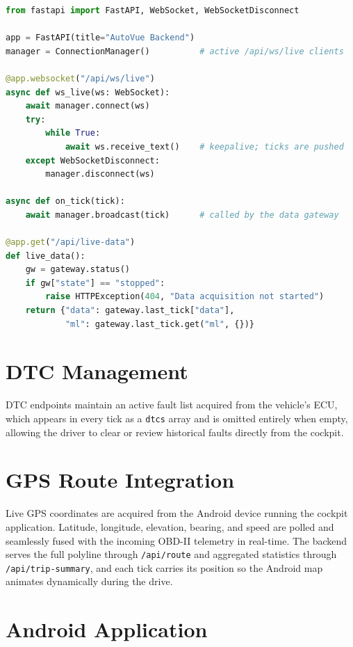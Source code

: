 \documentclass[10pt,a4paper]{report}
\begin{document}
\begin{lstlisting}[language=Python, caption={WebSocket Broadcast Layer}, label={lst:ws}]
from fastapi import FastAPI, WebSocket, WebSocketDisconnect

app = FastAPI(title="AutoVue Backend")
manager = ConnectionManager()          # active /api/ws/live clients

@app.websocket("/api/ws/live")
async def ws_live(ws: WebSocket):
    await manager.connect(ws)
    try:
        while True:
            await ws.receive_text()    # keepalive; ticks are pushed
    except WebSocketDisconnect:
        manager.disconnect(ws)

async def on_tick(tick):
    await manager.broadcast(tick)      # called by the data gateway

@app.get("/api/live-data")
def live_data():
    gw = gateway.status()
    if gw["state"] == "stopped":
        raise HTTPException(404, "Data acquisition not started")
    return {"data": gateway.last_tick["data"],
            "ml": gateway.last_tick.get("ml", {})}
\end{lstlisting}

\section{DTC Management}

DTC endpoints maintain an active fault list acquired from the vehicle's ECU, which appears in every tick as a \texttt{dtcs} array and is omitted entirely when empty, allowing the driver to clear or review historical faults directly from the cockpit.

\section{GPS Route Integration}

Live GPS coordinates are acquired from the Android device running the cockpit application. Latitude, longitude, elevation, bearing, and speed are polled and seamlessly fused with the incoming OBD-II telemetry in real-time. The backend serves the full polyline through \texttt{/api/route} and aggregated statistics through \texttt{/api/trip-summary}, and each tick carries its position so the Android map animates dynamically during the drive.

\section{Android Application}
\end{document}

